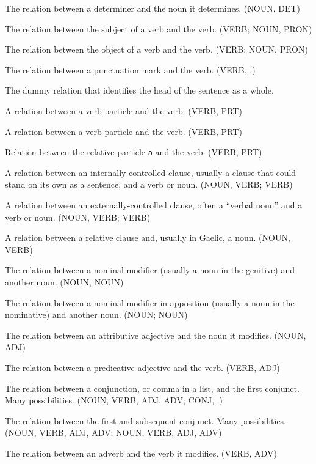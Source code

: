 \documentclass[a4paper]{article}
\begin{document}
 The relation between a determiner and the noun it determines. (NOUN, DET)

 The relation between the subject of a verb and the verb. (VERB; NOUN, PRON)

 The relation between the object of a verb and the verb. (VERB; NOUN, PRON)

 The relation between a punctuation mark and the verb. (VERB, .)

 The dummy relation that identifies the head of the sentence as a whole.

 A relation between a verb particle and the verb. (VERB, PRT)

 A relation between a verb particle and the verb. (VERB, PRT)

 Relation between the relative particle \texttt{a} and the verb. (VERB, PRT)

 A relation between an internally-controlled clause, usually a clause that could stand on its own as a sentence, and a verb or noun. (NOUN, VERB; VERB)

 A relation between an externally-controlled clause, often a ``verbal noun'' and a verb or noun. (NOUN, VERB; VERB)

 A relation between a relative clause and, usually in Gaelic, a noun. (NOUN, VERB)

 The relation between a nominal modifier (usually a noun in the genitive) and another noun. (NOUN, NOUN)

 The relation between a nominal modifier in apposition (usually a noun in the nominative) and another noun. (NOUN; NOUN)

 The relation between an attributive adjective and the noun it modifies. (NOUN, ADJ)

 The relation between a predicative adjective and the verb. (VERB, ADJ)

 The relation between a conjunction, or comma in a list, and the first conjunct. Many possibilities. (NOUN, VERB, ADJ, ADV; CONJ, .)

 The relation between the first and subsequent conjunct. Many possibilities. (NOUN, VERB, ADJ, ADV;  NOUN, VERB, ADJ, ADV)

 The relation between an adverb and the verb it modifies. (VERB, ADV)
\end{document}
